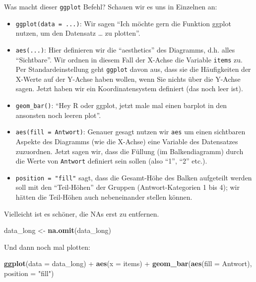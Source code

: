 \documentclass[12pt,ngerman,]{book}
\makeatletter
\newenvironment{Shaded}{\begin{snugshade}}{\end{snugshade}}
\newcommand{\KeywordTok}[1]{\textcolor[rgb]{0.13,0.29,0.53}{\textbf{{#1}}}}
\newcommand{\DataTypeTok}[1]{\textcolor[rgb]{0.13,0.29,0.53}{{#1}}}
\newcommand{\StringTok}[1]{\textcolor[rgb]{0.31,0.60,0.02}{{#1}}}
\newcommand{\NormalTok}[1]{{#1}}
\providecommand{\tightlist}{%
  \setlength{\itemsep}{0pt}\setlength{\parskip}{0pt}}
\newenvironment{kframe}{%
\medskip{}
\setlength{\fboxsep}{.8em}
 \def\at@end@of@kframe{}%
 \ifinner\ifhmode%
  \def\at@end@of@kframe{\end{minipage}}%
  \begin{minipage}{\columnwidth}%
 \fi\fi%
 \def\FrameCommand##1{\hskip\@totalleftmargin \hskip-\fboxsep
 \colorbox{shadecolor}{##1}\hskip-\fboxsep
     \hskip-\linewidth \hskip-\@totalleftmargin \hskip\columnwidth}%
 \MakeFramed {\advance\hsize-\width
   \@totalleftmargin\z@ \linewidth\hsize
   \@setminipage}}%
 {\par\unskip\endMakeFramed%
 \at@end@of@kframe}
\renewenvironment{Shaded}{\begin{kframe}}{\end{kframe}}
\theoremstyle{definition}
\theoremstyle{definition}
\theoremstyle{remark}
\makeatother
\begin{document}
Was macht dieser \texttt{ggplot} Befehl? Schauen wir es uns in Einzelnen
an:

\begin{itemize}
\tightlist
\item
  \texttt{ggplot(data\ =\ ...)}: Wir sagen ``Ich möchte gern die
  Funktion ggplot nutzen, um den Datensatz \ldots{} zu plotten''.
\item
  \texttt{aes(...)}: Hier definieren wir die ``aesthetics'' des
  Diagramms, d.h. alles ``Sichtbare''. Wir ordnen in diesem Fall der
  X-Achse die Variable \texttt{items} zu. Per Standardeinstellung geht
  \texttt{ggplot} davon aus, dass sie die Häufigkeiten der X-Werte auf
  der Y-Achse haben wollen, wenn Sie nichts über die Y-Achse sagen.
  Jetzt haben wir ein Koordinatensystem definiert (das noch leer ist).
\item
  \texttt{geom\_bar()}: ``Hey R oder ggplot, jetzt male mal einen
  barplot in den ansonsten noch leeren plot''.
\item
  \texttt{aes(fill\ =\ Antwort)}: Genauer gesagt nutzen wir \texttt{aes}
  um einen sichtbaren Aspekte des Diagramms (wie die X-Achse) eine
  Variable des Datensatzes zuzuordnen. Jetzt sagen wir, dass die Füllung
  (im Balkendiagramm) durch die Werte von \texttt{Antwort} definiert
  sein sollen (also ``1'', ``2'' etc.).
\item
  \texttt{position\ =\ "fill"} sagt, dass die Gesamt-Höhe des Balken
  aufgeteilt werden soll mit den ``Teil-Höhen'' der Gruppen
  (Antwort-Kategorien 1 bis 4); wir hätten die Teil-Höhen auch
  nebeneinander stellen können.
\end{itemize}

Vielleicht ist es schöner, die NAs erst zu entfernen.

\begin{Shaded}
\begin{Highlighting}[]
\NormalTok{data_long <-}\StringTok{ }\KeywordTok{na.omit}\NormalTok{(data_long)}
\end{Highlighting}
\end{Shaded}

Und dann noch mal plotten:

\begin{Shaded}
\begin{Highlighting}[]
\KeywordTok{ggplot}\NormalTok{(}\DataTypeTok{data =} \NormalTok{data_long) +}
\StringTok{  }\KeywordTok{aes}\NormalTok{(}\DataTypeTok{x =} \NormalTok{items)  +}
\StringTok{  }\KeywordTok{geom_bar}\NormalTok{(}\KeywordTok{aes}\NormalTok{(}\DataTypeTok{fill =} \NormalTok{Antwort), }\DataTypeTok{position =} \StringTok{"fill"}\NormalTok{) }
\end{Highlighting}
\end{Shaded}
\end{document}
